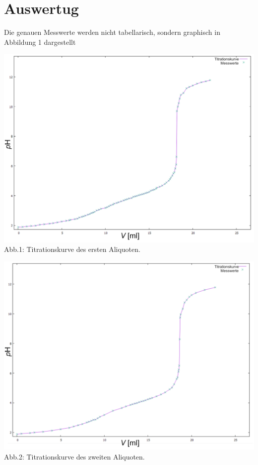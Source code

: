 \documentclass[12pt]{scrartcl} %
\begin{document}
\newpage
\section{Auswertug}
Die genauen Messwerte werden nicht tabellarisch, sondern graphisch in Abbildung 1 dargestellt
\begin{center}
    \includegraphics[width=\textwidth]{Abb/oleg.png}\\
    Abb.1: Titrationskurve des ersten Aliquoten.
\end{center}
\begin{center}
    \includegraphics[width=\textwidth]{Abb/oleg2.png}\\
    Abb.2: Titrationskurve des zweiten Aliquoten.
\end{center}
\end{document}
